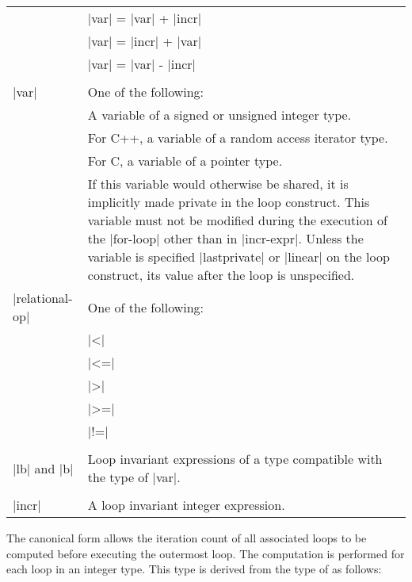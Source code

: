 \begin{ccppspecific}
\begin{supertabular}{ p{0.8in} p{4.5in}}
    & {\plc|var|} = {\plc|var|} + {\plc|incr|}\\
    & {\plc|var|} = {\plc|incr|} + {\plc|var|}\\
    & {\plc|var|} = {\plc|var|} - {\plc|incr|}\\
    & \\
    {\plc|var|} & One of the following:\\
    & \hspace{1.5em}A variable of a signed or unsigned integer type.\\
    & \hspace{1.5em}For C++, a variable of a random access iterator type.\\
    & \hspace{1.5em}For C, a variable of a pointer type.\\
    & If this variable would otherwise be shared, it is implicitly made private in the loop 
    construct. This variable must not be modified during the execution of the {\plc|for-loop|} 
    other than in {\plc|incr-expr|}. Unless the variable is specified {\code|lastprivate|}
    or {\code|linear|} on the loop construct, its value after the loop is unspecified.\\
    {\plc|relational-op|} & One of the following:\\
    & {\code|<|}\\
    & {\code|<=|}\\
    & {\code|>|}\\
    & {\code|>=|}\\
    & {\code|!=|}\\
    & \\
    {\plc|lb|} and {\plc|b|} & Loop invariant expressions of a type compatible with the type of {\plc|var|}.\\
    & \\
    {\plc|incr|} & A loop invariant integer expression.\\
\end{supertabular}
\medskip

\linenumbers

\begin{figure}[t!]
\end{figure}
The canonical form allows the iteration count of all associated loops to be computed 
before executing the outermost loop. The computation is performed for each loop in an 
integer type. This type is derived from the type of  as follows:


\end{ccppspecific}
